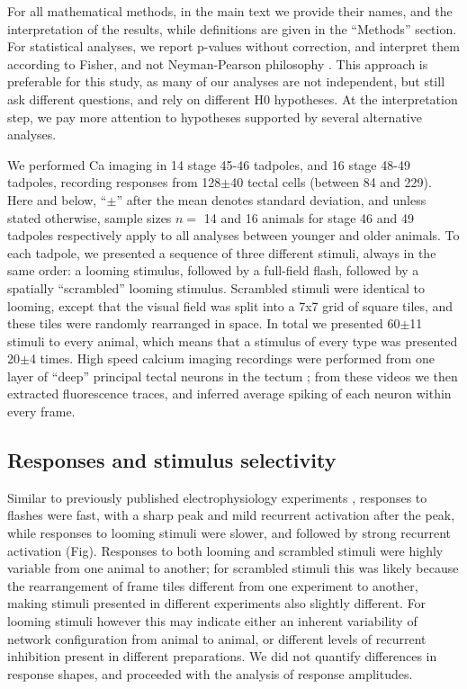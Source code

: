 \documentclass{article}
\begin{document}
For all mathematical methods, in the main text we provide their names, and the interpretation of the results, while definitions are given in the “Methods” section. For statistical analyses, we report p-values without correction, and interpret them according to Fisher, and not Neyman-Pearson philosophy \citep{greenland2016}. This approach is preferable for this study, as many of our analyses are not independent, but still ask different questions, and rely on different H0 hypotheses. At the interpretation step, we pay more attention to hypotheses supported by several alternative analyses.

We performed Ca imaging in 14 stage 45-46 tadpoles, and 16 stage 48-49 tadpoles, recording responses from 128$\pm$40 tectal cells (between 84 and 229). Here and below, “$\pm$” after the mean denotes standard deviation, and unless stated otherwise, sample sizes $n=$ 14 and 16 animals for stage 46 and 49 tadpoles respectively apply to all analyses between younger and older animals. To each tadpole, we presented a sequence of three different stimuli, always in the same order: a looming stimulus, followed by a full-field flash, followed by a spatially “scrambled” looming stimulus. Scrambled stimuli were identical to looming, except that the visual field was split into a 7x7 grid of square tiles, and these tiles were randomly rearranged in space. In total we presented 60$\pm$11 stimuli to every animal, which means that a stimulus of every type was presented 20$\pm$4 times. High speed calcium imaging recordings were performed from one layer of “deep” principal tectal neurons in the tectum \citep{xu2011,truszkowski2017}; from these videos we then extracted fluorescence traces, and inferred average spiking of each neuron within every frame.

\subsection*{Responses and stimulus selectivity}

Similar to previously published electrophysiology experiments \citep{khakhalin2014}, responses to flashes were fast, with a sharp peak and mild recurrent activation after the peak, while responses to looming stimuli were slower, and followed by strong recurrent activation (Fig). Responses to both looming and scrambled stimuli were highly variable from one animal to another; for scrambled stimuli this was likely because the rearrangement of frame tiles different from one experiment to another, making stimuli presented in different experiments also slightly different. For looming stimuli however this may indicate either an inherent variability of network configuration from animal to animal, or different levels of recurrent inhibition present in different preparations. We did not quantify differences in response shapes, and proceeded with the analysis of response amplitudes.
\end{document}
